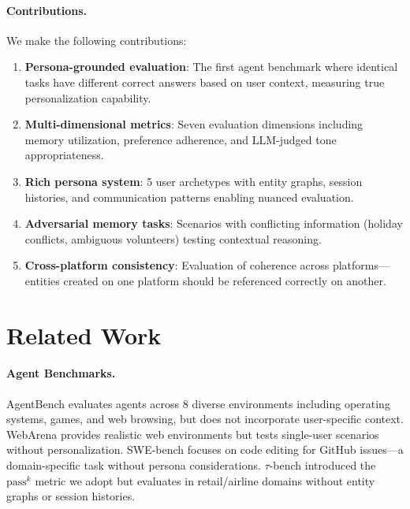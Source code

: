 \documentclass{article}
\newcommand{\passmark}{\text{pass}^k}
\begin{document}
\paragraph{Contributions.} We make the following contributions:
\begin{enumerate}[leftmargin=*, itemsep=2pt, topsep=2pt]
    \item \textbf{Persona-grounded evaluation}: The first agent benchmark where identical tasks have different correct answers based on user context, measuring true personalization capability.
    \item \textbf{Multi-dimensional metrics}: Seven evaluation dimensions including memory utilization, preference adherence, and LLM-judged tone appropriateness.
    \item \textbf{Rich persona system}: 5 user archetypes with entity graphs, session histories, and communication patterns enabling nuanced evaluation.
    \item \textbf{Adversarial memory tasks}: Scenarios with conflicting information (holiday conflicts, ambiguous volunteers) testing contextual reasoning.
    \item \textbf{Cross-platform consistency}: Evaluation of coherence across platforms---entities created on one platform should be referenced correctly on another.
\end{enumerate}

\section{Related Work}
\label{sec:related}

\paragraph{Agent Benchmarks.} AgentBench \citep{agentbench2023} evaluates agents across 8 diverse environments including operating systems, games, and web browsing, but does not incorporate user-specific context. WebArena \citep{webarena2023} provides realistic web environments but tests single-user scenarios without personalization. SWE-bench \citep{swebench2024} focuses on code editing for GitHub issues---a domain-specific task without persona considerations. $\tau$-bench \citep{taubench2024} introduced the $\passmark$ metric we adopt but evaluates in retail/airline domains without entity graphs or session histories.
\end{document}
